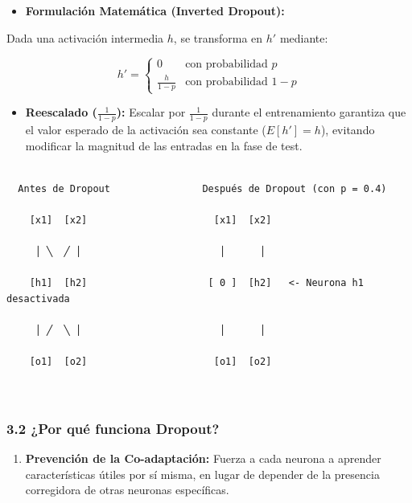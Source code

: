 \documentclass[11pt,oneside]{article}
\begin{document}
\begin{itemize}

\item \textbf{Formulación Matemática (Inverted Dropout):}

\end{itemize}

Dada una activación intermedia \(h\), se transforma en \(h'\) mediante:

\[h' = \begin{cases} 0 & \text{con probabilidad } p \\ \frac{h}{1-p} & \text{con probabilidad } 1-p \end{cases}\]

\begin{itemize}

\item \textbf{Reescalado (\(\frac{1}{1-p}\)):} Escalar por \(\frac{1}{1-p}\) durante el entrenamiento garantiza que el valor esperado de la activación sea constante (\(E[h'] = h\)), evitando modificar la magnitud de las entradas en la fase de test.

\end{itemize}

\begin{lstlisting}

  Antes de Dropout                Después de Dropout (con p = 0.4)

    [x1]  [x2]                      [x1]  [x2]

     │ ╲  ╱ │                        │      │

    [h1]  [h2]                     [ 0 ]  [h2]   <- Neurona h1 desactivada

     │ ╱  ╲ │                        │      │

    [o1]  [o2]                      [o1]  [o2]



\end{lstlisting}

\subsubsection{3.2 ¿Por qué funciona Dropout?}

\begin{enumerate}

\item \textbf{Prevención de la Co-adaptación:} Fuerza a cada neurona a aprender características útiles por sí misma, en lugar de depender de la presencia corregidora de otras neuronas específicas.

\end{enumerate}
\end{document}
